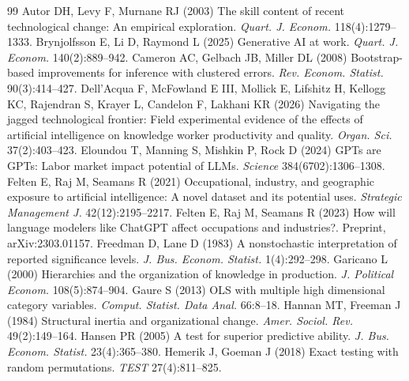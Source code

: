 \begin{thebibliography}{99}
\setlength{\itemsep}{1pt}\small
{} Autor DH, Levy F, Murnane RJ (2003) The skill content of recent technological change: An empirical exploration. \textit{Quart. J. Econom.} 118(4):1279--1333.
 Brynjolfsson E, Li D, Raymond L (2025) Generative AI at work. \textit{Quart. J. Econom.} 140(2):889--942.
 Cameron AC, Gelbach JB, Miller DL (2008) Bootstrap-based improvements for inference with clustered errors. \textit{Rev. Econom. Statist.} 90(3):414--427.
 Dell'Acqua F, McFowland E III, Mollick E, Lifshitz H, Kellogg KC, Rajendran S, Krayer L, Candelon F, Lakhani KR (2026) Navigating the jagged technological frontier: Field experimental evidence of the effects of artificial intelligence on knowledge worker productivity and quality. \textit{Organ. Sci.} 37(2):403--423.
 Eloundou T, Manning S, Mishkin P, Rock D (2024) GPTs are GPTs: Labor market impact potential of LLMs. \textit{Science} 384(6702):1306--1308.
 Felten E, Raj M, Seamans R (2021) Occupational, industry, and geographic exposure to artificial intelligence: A novel dataset and its potential uses. \textit{Strategic Management J.} 42(12):2195--2217.
 Felten E, Raj M, Seamans R (2023) How will language modelers like ChatGPT affect occupations and industries?. Preprint, arXiv:2303.01157.
 Freedman D, Lane D (1983) A nonstochastic interpretation of reported significance levels. \textit{J. Bus. Econom. Statist.} 1(4):292--298.
 Garicano L (2000) Hierarchies and the organization of knowledge in production. \textit{J. Political Econom.} 108(5):874--904.
 Gaure S (2013) OLS with multiple high dimensional category variables. \textit{Comput. Statist. Data Anal.} 66:8--18.
 Hannan MT, Freeman J (1984) Structural inertia and organizational change. \textit{Amer. Sociol. Rev.} 49(2):149--164.
 Hansen PR (2005) A test for superior predictive ability. \textit{J. Bus. Econom. Statist.} 23(4):365--380.
 Hemerik J, Goeman J (2018) Exact testing with random permutations. \textit{TEST} 27(4):811--825.

\end{thebibliography}
